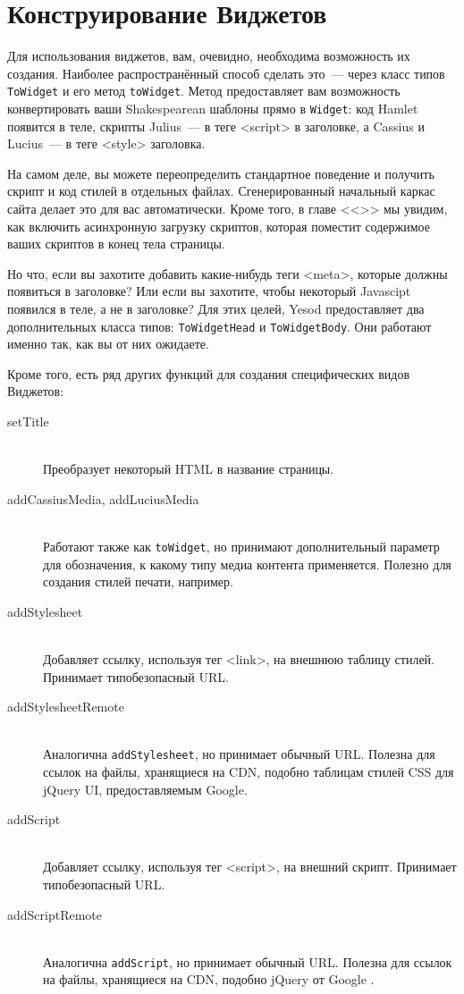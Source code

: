 \section{Конструирование Виджетов}
Для использования виджетов, вам, очевидно, необходима возможность их создания. Наиболее распространённый способ сделать это~--- через класс типов \lstinline'ToWidget' и его метод \lstinline'toWidget'. Метод предоставляет вам возможность конвертировать ваши Shakespearean шаблоны прямо в \lstinline'Widget': код Hamlet появится в теле, скрипты Julius~--- в теге <script> в заголовке, а Cassius и Lucius~--- в теге <style> заголовка.
\begin{remark}
На самом деле, вы можете переопределить стандартное поведение и получить скрипт и код стилей в отдельных файлах. Сгенерированный начальный каркас сайта делает это для вас автоматически. Кроме того, в главе <<>> мы увидим, как включить асинхронную загрузку скриптов, которая поместит содержимое ваших скриптов в конец тела страницы.
\end{remark}

Но что, если вы захотите добавить какие-нибудь теги <meta>, которые должны появиться в заголовке? Или если вы захотите, чтобы некоторый Javascipt появился в теле, а не в заголовке? Для этих целей, Yesod предоставляет два дополнительных класса типов: \lstinline'ToWidgetHead' и \lstinline'ToWidgetBody'. Они работают именно так, как вы от них ожидаете.

Кроме того, есть ряд других функций для создания специфических видов Виджетов:
\begin{description}
\item[setTitle] \hfill \\
Преобразует некоторый HTML в название страницы.
\item[addCassiusMedia, addLuciusMedia] \hfill \\
Работают также как \lstinline'toWidget', но принимают дополнительный параметр для обозначения, к какому типу медиа контента применяется. Полезно для создания стилей печати, например.
\item[addStylesheet] \hfill \\
Добавляет ссылку, используя тег <link>, на внешнюю таблицу стилей. Принимает типобезопасный URL.
\item[addStylesheetRemote] \hfill \\
Аналогична \lstinline'addStylesheet', но принимает обычный URL. Полезна для ссылок на файлы, хранящиеся на CDN, подобно таблицам стилей CSS для jQuery UI, предоставляемым Google.
\item[addScript] \hfill \\
Добавляет ссылку, используя тег <script>, на внешний скрипт. Принимает типобезопасный URL.
\item[addScriptRemote] \hfill \\
Аналогична \lstinline'addScript', но принимает обычный URL. Полезна для ссылок на файлы, хранящиеся на CDN, подобно jQuery от Google .
\end{description}


